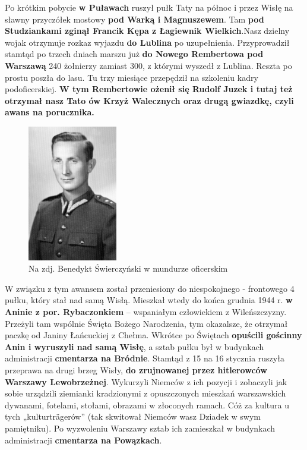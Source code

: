 Po krótkim pobycie \textbf{w Puławach} ruszył pułk Taty na północ i przez Wisłę na sławny przyczółek mostowy \textbf{pod Warką i Magnuszewem}. Tam \textbf{pod Studziankami zginął Francik Kępa z Łagiewnik Wielkich}.Nasz dzielny wojak otrzymuje rozkaz wyjazdu \textbf{do Lublina} po uzupełnienia. Przyprowadził stamtąd po trzech dniach marszu już \textbf{do Nowego Rembertowa pod Warszawą} 240 żołnierzy zamiast 300, z którymi wyszedł z Lublina. Reszta po prostu poszła do lasu. Tu trzy miesiące przepędził na szkoleniu kadry podoficerskiej. \textbf{W tym Rembertowie ożenił się Rudolf Juzek i tutaj też otrzymał nasz Tato ów Krzyż Walecznych oraz drugą gwiazdkę, czyli awans na porucznika.} 

\begin{figure}[!h]
\begin{center}
\includegraphics[width=0.35\textwidth]{photo/benedykt_swierczynski_wojna_3.jpg}
\caption[Benedykt Świerczyński w mundurze oficerskim]{Na zdj. Benedykt Świerczyński w mundurze oficerskim}
\end{center}
\end{figure}

W związku z tym awansem został przeniesiony do niespokojnego - frontowego 4 pułku, który stał nad samą Wisłą. Mieszkał wtedy do końca grudnia 1944 r. \textbf{w Aninie z por. Rybaczonkiem} – wspaniałym człowiekiem z Wileńszczyzny. Przeżyli tam wspólnie Święta Bożego Narodzenia, tym okazalsze, że otrzymał paczkę od Janiny Łańcuckiej z Chełma. Wkrótce po Świętach \textbf{opuścili gościnny Anin i wyruszyli nad samą Wisłę}, a sztab pułku był w budynkach administracji \textbf{cmentarza na Bródnie}. Stamtąd z 15 na 16 stycznia ruszyła przeprawa na drugi brzeg Wisły,\textbf{ do zrujnowanej przez hitlerowców Warszawy Lewobrzeżnej}. Wykurzyli Niemców z ich pozycji i zobaczyli jak sobie urządzili ziemianki kradzionymi z opuszczonych mieszkań warszawskich dywanami, fotelami, stołami, obrazami w złoconych ramach. Cóż za kultura u tych „kulturträgerów” (tak skwitował Niemców wasz Dziadek w swym pamiętniku). Po wyzwoleniu Warszawy sztab ich zamieszkał w budynkach administracji \textbf{cmentarza na Powązkach}. 

